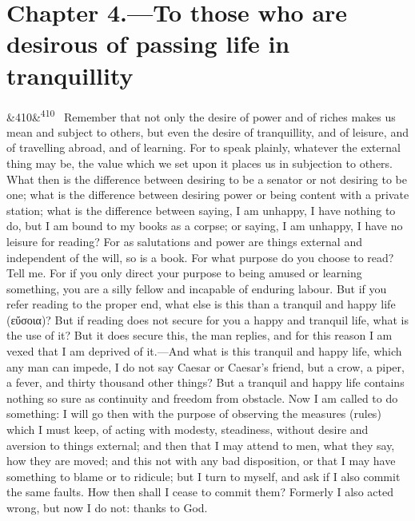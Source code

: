 \documentclass[12pt]{article}
\newcommand{\para}[1][]{\par\noindent\ifx&#1&\else\textsuperscript{\footnotesize #1}~\fi}
\begin{document}
\section*{Chapter 4.---To those who are desirous of passing life in tranquillity}

\para[410] Remember that not only the desire of power and of riches makes us mean and subject to others, but even the desire of tranquillity, and of leisure, and of travelling abroad, and of learning. For to speak plainly, whatever the external thing may be, the value which we set upon it places us in subjection to others. What then is the difference between desiring to be a senator or not desiring to be one; what is the difference between desiring power or being content with a private station; what is the difference between saying, I am unhappy, I have nothing to do, but I am bound to my books as a corpse; or saying, I am unhappy, I have no leisure for reading? For as salutations and power are things external and independent of the will, so is a book. For what purpose do you choose to read? Tell me. For if you only direct your purpose to being amused or learning something, you are a silly fellow and incapable of enduring labour. But if you refer reading to the proper end, what else is this than a tranquil and happy life (εὔσοια)? But if reading does not secure for you a happy and tranquil life, what is the use of it? But it does secure this, the man replies, and for this reason I am vexed that I am deprived of it.—And what is this tranquil and happy life, which any man can impede, I do not say Caesar or Caesar's friend, but a crow, a piper, a fever, and thirty thousand other things? But a tranquil and happy life contains nothing so sure as continuity and freedom from obstacle. Now I am called to do something: I will go then with the purpose of observing the measures (rules) which I must keep, of acting with modesty, steadiness, without desire and aversion to things external; and then that I may attend to men, what they say, how they are moved; and this not with any bad disposition, or that I may have something to blame or to ridicule; but I turn to myself, and ask if I also commit the same faults. How then shall I cease to commit them? Formerly I also acted wrong, but now I do not: thanks to God.
\end{document}

